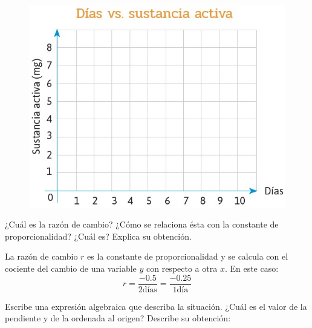 \begin{parts}
\begin{multicols}{2}
        \begin{figure}[H]
            \centering
            \includegraphics[width=0.9\linewidth]{../images/farmacos_tabla}
            \label{fig:farmacos_tabla}
        \end{figure}

    \end{multicols}



    ¿Cuál es la razón de cambio? ¿Cómo se relaciona ésta con la constante de proporcionalidad? ¿Cuál es? Explica su obtención.

    \begin{solutionbox}{2cm}
        La razón de cambio $r$ es la constante de proporcionalidad y se calcula con el cociente del cambio de una variable $y$ con respecto a otra $x$. En este caso:
        \[r=\dfrac{-0.5}{2 \text{días}}=\dfrac{-0.25}{1 \text{día}}\]
    \end{solutionbox}

    Escribe una expresión algebraica que describa la situación. ¿Cuál es el valor de la pendiente y de la ordenada al origen? Describe su obtención:


\end{parts}
